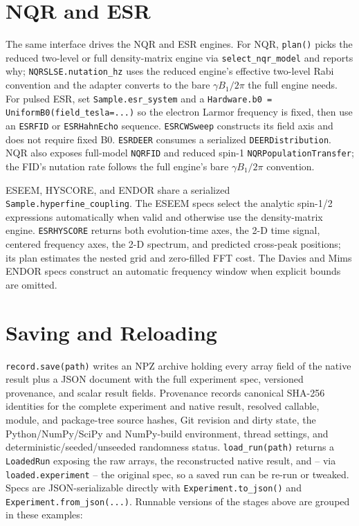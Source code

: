 \documentclass[11pt,oneside]{report}
\newcommand{\code}[1]{\texttt{#1}}
\begin{document}
\section{NQR and ESR}

The same interface drives the NQR and ESR engines. For NQR, \code{plan()} picks
the reduced two-level or full density-matrix engine via \code{select\_nqr\_model}
and reports why; \code{NQRSLSE.nutation\_hz} uses the reduced engine's effective
two-level Rabi convention and the adapter converts to the bare
\(\gamma B_1 / 2\pi\) the full engine needs. For pulsed ESR, set
\code{Sample.esr\_system} and a \code{Hardware.b0 = UniformB0(field\_tesla=...)}
so the electron Larmor frequency is fixed, then use an \code{ESRFID} or
\code{ESRHahnEcho} sequence. \code{ESRCWSweep} constructs its field axis and
does not require fixed B0. \code{ESRDEER} consumes a serialized
\code{DEERDistribution}. NQR also exposes full-model \code{NQRFID} and reduced
spin-1 \code{NQRPopulationTransfer}; the FID's nutation rate follows the full
engine's bare \(\gamma B_1/2\pi\) convention.

ESEEM, HYSCORE, and ENDOR share a serialized
\code{Sample.hyperfine\_coupling}. The ESEEM specs select the analytic
spin-1/2 expressions automatically when valid and otherwise use the
density-matrix engine. \code{ESRHYSCORE} returns both evolution-time axes, the
2-D time signal, centered frequency axes, the 2-D spectrum, and predicted
cross-peak positions; its plan estimates the nested grid and zero-filled FFT
cost. The Davies and Mims ENDOR specs construct an automatic frequency window
when explicit bounds are omitted.

\section{Saving and Reloading}

\code{record.save(path)} writes an NPZ archive holding every array field of the
native result plus a JSON document with the full experiment spec, versioned
provenance, and scalar result fields. Provenance records canonical SHA-256
identities for the complete experiment and native result, resolved callable,
module, and package-tree source hashes, Git revision and dirty state, the Python/NumPy/SciPy and
NumPy-build environment, thread settings, and deterministic/seeded/unseeded
randomness status. \code{load\_run(path)} returns a \code{LoadedRun}
exposing the raw arrays, the reconstructed native result, and -- via
\code{loaded.experiment} -- the original spec, so a saved run can be re-run or
tweaked. Specs are JSON-serializable directly with
\code{Experiment.to\_json()} and \code{Experiment.from\_json(...)}. Runnable
versions of the stages above are grouped in these examples:
\end{document}
